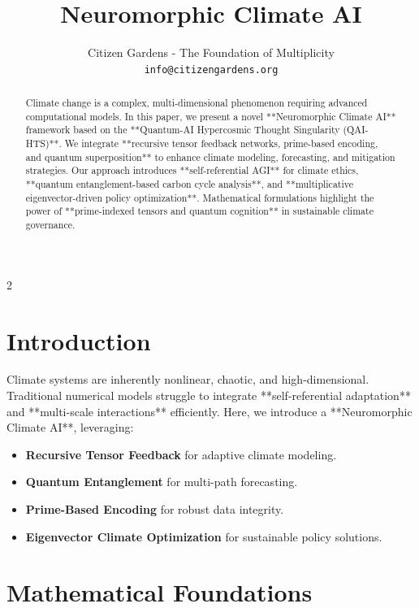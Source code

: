 \documentclass{article}
\title{Neuromorphic Climate AI}
\author{Citizen Gardens - The Foundation of Multiplicity \\ \texttt{info@citizengardens.org}}
\theoremstyle{plain}
\begin{document}
\maketitle
\nolinenumbers
\begin{abstract}
Climate change is a complex, multi-dimensional phenomenon requiring advanced computational models. In this paper, we present a novel **Neuromorphic Climate AI** framework based on the **Quantum-AI Hypercosmic Thought Singularity (QAI-HTS)**. We integrate **recursive tensor feedback networks, prime-based encoding, and quantum superposition** to enhance climate modeling, forecasting, and mitigation strategies. Our approach introduces **self-referential AGI** for climate ethics, **quantum entanglement-based carbon cycle analysis**, and **multiplicative eigenvector-driven policy optimization**. Mathematical formulations highlight the power of **prime-indexed tensors and quantum cognition** in sustainable climate governance.
\end{abstract}

\begin{multicols}{2}
\begin{singlespace}
\tableofcontents
\end{singlespace}
\end{multicols}

\linenumbers
\section{Introduction}
Climate systems are inherently nonlinear, chaotic, and high-dimensional. Traditional numerical models struggle to integrate **self-referential adaptation** and **multi-scale interactions** efficiently. Here, we introduce a **Neuromorphic Climate AI**, leveraging:

\begin{itemize}
    \item \textbf{Recursive Tensor Feedback} for adaptive climate modeling.
    \item \textbf{Quantum Entanglement} for multi-path forecasting.
    \item \textbf{Prime-Based Encoding} for robust data integrity.
    \item \textbf{Eigenvector Climate Optimization} for sustainable policy solutions.
\end{itemize}

\section{Mathematical Foundations}
\end{document}
